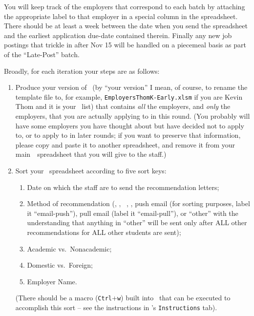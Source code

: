\documentclass{\econtex}
\newcommand\redout{\bgroup\markoverwith
  {\textcolor{red}{\rule[.5ex]{2pt}{1pt}}}\ULon}
\begin{document}
You will keep track of the employers that correspond to each batch 
by attaching the appropriate label to that employer in a special
column in the spreadsheet.  There should be at 
least a week between the date when you send the spreadsheet and the
earliest application due-date contained therein.  Finally any new job postings
that trickle in after Nov 15 will be handled on a piecemeal basis
as part of the ``Late-Post'' batch.

Broadly, for each iteration your steps are as follows:
\begin{enumerate}
\item Produce your version of \EMtt~(by ``your version'' I mean, of
  course, to rename the template file to, for example,
  \texttt{EmployersThomK-Early.xlsm} if you are Kevin Thom and it is
  your \Early~list) that contains \textit{all} the employers, and \textit{only} the employers, that you are actually applying to in this
  round.  (You probably will have some employers you have thought
  about but have decided not to apply to, or to apply to in later rounds; if you want to preserve that
  information, please copy and paste it to another spreadsheet, and
  remove it from your main~{\EMW}~spreadsheet that you will give to the
  staff.)

  
\item Sort your \EMtt~spreadsheet according to five sort keys:
  \begin{enumerate} 
  \item Date on which the staff are to send the recommendation letters; 
  \item Method of recommendation (\AEA, \AJO, {\EJM}~, \Interfolio, push email (for sorting purposes,
    label it ``email-push''), pull email (label it ``email-pull''), or
    ``other'' with the understanding that anything in ``other'' will be
    sent only after ALL other recommendations for ALL other students are
    sent);
  \item Academic vs.\ Nonacademic;
  \item Domestic vs.\ Foreign;
  \item Employer Name. 
  \end{enumerate} 

  (There should be a macro (\texttt{Ctrl}+\texttt{w}) built into \EMtt~that can be
  executed to accomplish this sort -- see the instructions in
  \EMtt's \texttt{Instructions} tab).



\end{enumerate}
\end{document}
